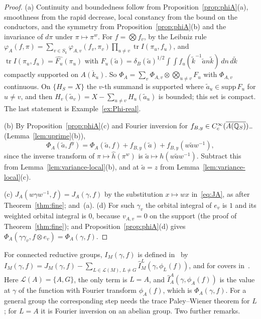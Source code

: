 \begin{proof}
(a) Continuity and boundedness follow from
Proposition~\ref{prop:phiA}(a), smoothness from the rapid decrease, local
constancy from the bound on the conductors, and
the symmetry from Proposition~\ref{prop:phiA}(b) and the invariance of
$d\pi$ under $\pi\mapsto\pi^w$. For $f=\bigotimes f_v$, by the Leibniz
rule $\varphi_A(f,\pi)=\sum_{v\in S_k}\varphi_{A,v}(f_v,\pi_v)\prod_{u\ne
v}\operatorname{tr}I(\pi_u,f_u)$, and $\operatorname{tr}I(\pi_u,f_u)=
\widehat{F_u}(\pi_u)$ with $F_u(\tilde a)=\delta_B(\tilde a)^{1/2}\int
\int f_u(\tilde k^{-1}\tilde an\tilde k)\,dn\,d\tilde k$ compactly
supported on $\overline{A(k_u)}$. So $\Phi_A=\sum_v\Phi_{A,v}\otimes
\bigotimes_{u\ne v}F_u$ with $\Phi_{A,v}$ continuous. On
$\{H_S=X\}$ the $v$-th summand is supported where $\tilde a_u\in
\mathrm{supp}\,F_u$ for $u\ne v$, and then $H_v(\tilde a_v)=X-\sum_{u\ne
v}H_u(\tilde a_u)$ is bounded; this set is compact. The last statement is
Example~\ref{ex:Phi-real}.

(b) By Proposition~\ref{prop:phiA}(c) and Fourier inversion for
$f_{B,y}\in C_c^\infty(\overline{A(\mathbb{Q}_S)})_-$ (Lemma~\ref{lem:uprime}(b)),
\[
\Phi_A(\tilde a,f^y)=\Phi_A(\tilde a,f)+f_{B,y}(\tilde a)+f_{B,y}(w\tilde
aw^{-1}),
\]
since the inverse transform of $\pi\mapsto\hat h(\pi^w)$ is $\tilde
a\mapsto h(w\tilde aw^{-1})$. Subtract this from
Lemma~\ref{lem:variance-local}(b), and at $\tilde a=z$ from
Lemma~\ref{lem:variance-local}(c).

(c) $J_A(w\gamma w^{-1},f)=J_A(\gamma,f)$ by the substitution $x\mapsto
wx$ in~\eqref{eq:JA}, as after Theorem~\ref{thm:fine}; and~(a). (d) For
such $\gamma_v$ the orbital integral of $e_v$ is $1$ and its weighted
orbital integral is $0$, because $v_{A,v}=0$ on the support (the proof of
Theorem~\ref{thm:fine}); and Proposition~\ref{prop:phiA}(d) gives
$\Phi_A(\gamma\gamma_v,f\otimes e_v)=\Phi_A(\gamma,f)$.
\end{proof}

For connected reductive groups, $I_M(\gamma,f)$ is defined in~\cite[\S2]{Ar88b}
by $I_M(\gamma,f)=J_M(\gamma,f)-\sum_{L\in\mathcal L(M),\,L\ne G}
\hat I^L_M(\gamma,\phi_L(f))$, and for covers in~\cite[\S4.5]{Li14b}. Here
$\mathcal L(A)=\{A,G\}$, the only term is $L=A$, and
$\hat I_A^A(\gamma,\phi_A(f))$ is the value at $\gamma$ of the function
with Fourier transform $\phi_A(f)$, which is $\Phi_A(\gamma,f)$. For a
general group the corresponding step needs the trace Paley--Wiener
theorem for $L$; for $L=A$ it is Fourier inversion on an abelian group.
Two further remarks.

